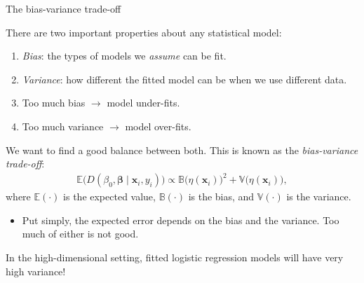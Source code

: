 \documentclass[8pt]{beamer}
\newcommand{\mys}{\vspace{0.5cm} \pause
}
\begin{document}
\begin{frame}{\color{white} The bias-variance trade-off}

There are two important properties about any statistical model:
\begin{enumerate}
    \item \textit{Bias}: the types of models we \textit{assume} can be fit.
    \item \textit{Variance}: how different the fitted model can be when we use different data.
    \item Too much bias $\to$ model under-fits.
    \item Too much variance $\to$ model over-fits.
\end{enumerate} \mys

We want to find a good balance between both. This is known as the \textit{bias-variance trade-off}:
\begin{align*}
    \mathbb{E}\Big(D(\beta_0, \bm{\beta} \mid \bm{x}_i, y_i)\Big) \propto \mathbb{B}\big(\eta(\bm{x}_i) \big)^2 + \mathbb{V}\big(\eta(\bm{x}_i) \big),
\end{align*}
where $\mathbb{E}(\cdot)$ is the expected value, $\mathbb{B}(\cdot)$ is the bias, and $\mathbb{V}(\cdot)$ is the variance. 
\begin{itemize}
    \item Put simply, the expected error depends on the bias and the variance. Too much of either is not good.
\end{itemize}\mys

In the high-dimensional setting, fitted logistic regression models will have very high variance! %
    
\end{frame}
\end{document}
